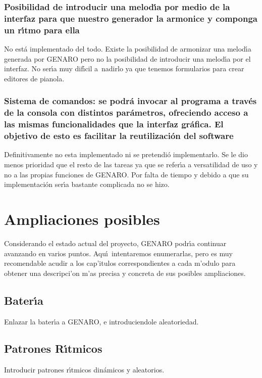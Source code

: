 \documentclass[a4paper,11pt]{article}
\begin{document}
\subsubsection{Posibilidad de introducir una melod\'\i a por medio de la interfaz para que nuestro generador la armonice y componga un r\'\i tmo para ella}
No est\'a implementado del todo. Existe la posibilidad de armonizar una melod\'\i a generada por GENARO 
pero no la posibilidad de introducir una melod\'\i a por el interfaz. No ser\'\i a muy dif\'\i cil a~nadirlo ya que tenemos formularios para crear editores de pianola.

\subsubsection{Sistema de comandos: se podr\'a invocar al programa a trav\'es de la consola con distintos par\'ametros, ofreciendo acceso a las mismas funcionalidades que la interfaz gr\'afica. El objetivo de esto es facilitar la reutilizaci\'on del software}
Definitivamente no esta implementado ni se pretendi\'o implementarlo. Se le dio menos prioridad que el resto
de las tareas ya que se refer\'\i a a versatilidad de uso y no a las propias funciones de GENARO. Por falta
de tiempo y debido a que su implementaci\'on ser\'\i a bastante complicada no se hizo.


\section{Ampliaciones posibles}

Considerando el estado actual del proyecto, GENARO podr\'\i a continuar avanzando en varios puntos. Aqu\'\i ~intentaremos enumerarlas, pero es muy recomendable acudir a los cap'itulos correspondientes a cada m'odulo para obtener una descripci'on m'as precisa y concreta de sus posibles ampliaciones.

\subsection{Bater\'\i a}

Enlazar la bater\'\i a a GENARO, e introduciendole aleatoriedad.

\subsection{Patrones R\'\i tmicos}

Introducir patrones r\'\i tmicos din\'amicos y aleatorios.
\end{document}
